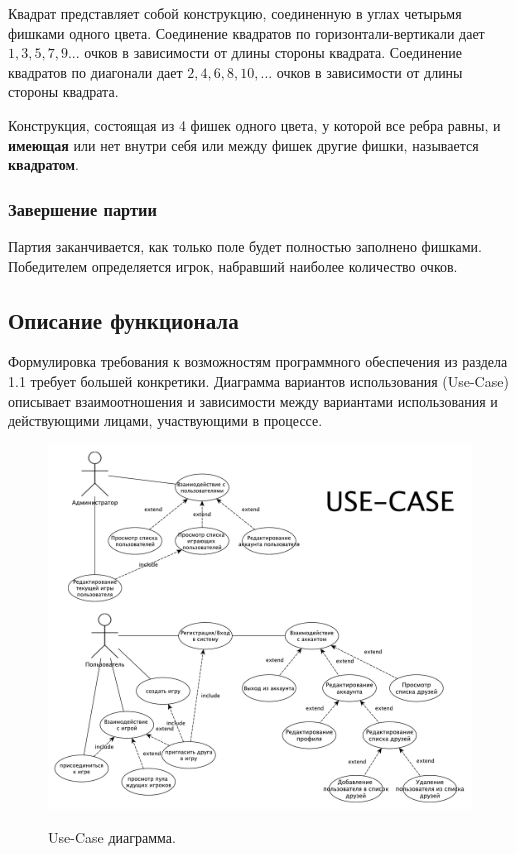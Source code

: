 \documentclass[a4paper,14pt]{extarticle}
\begin{document}
 	Квадрат представляет собой конструкцию, соединенную в углах четырьмя фишками одного цвета. Соединение квадратов по горизонтали-вертикали дает $1, 3, 5, 7, 9...$ очков в зависимости от длины стороны квадрата. Соединение квадратов по диагонали дает $2, 4, 6, 8, 10,...$ очков в зависимости от длины стороны квадрата. 
 	
 	Конструкция, состоящая из 4 фишек одного цвета, у которой все ребра равны, и {\bf имеющая} или нет внутри себя или между фишек другие фишки, называется {\bf квадратом}.
 	
 	\subsubsection{Завершение партии}
 	
 	Партия заканчивается, как только поле будет полностью заполнено фишками. Победителем определяется игрок, набравший наиболее количество очков.
 	
 	\newpage
 	
 	\subsection{Описание функционала}
 	
 	Формулировка требования к возможностям программного обеспечения из раздела 1.1 требует большей конкретики. Диаграмма вариантов использования (Use-Case) описывает взаимоотношения и зависимости между вариантами использования и действующими лицами, участвующими в процессе.
 	
 	\begin{figure}[h!]
 		\begin{center}
 			{\includegraphics[scale = 0.5]{img/use-case.pdf}}
 			\label{ris:use-case}
 		\end{center}
 		\caption{Use-Case диаграмма.}
 	\end{figure}
 	
\end{document}
